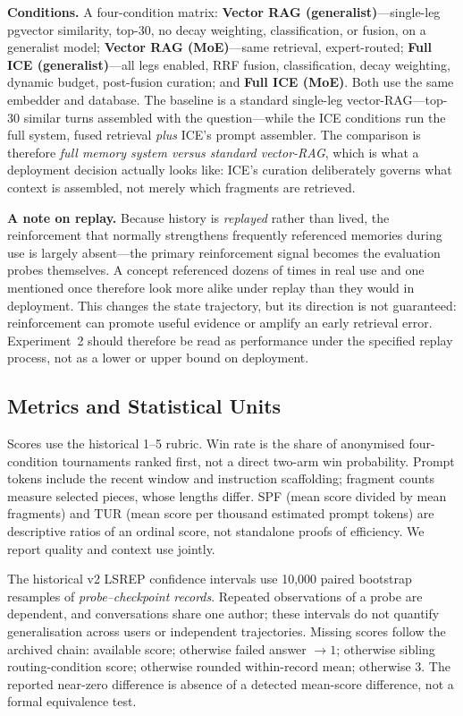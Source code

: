\documentclass[twoside,11pt]{article}
\begin{document}
\textbf{Conditions.} A four-condition matrix: \textbf{Vector RAG (generalist)}---single-leg pgvector similarity, top-30, no decay weighting, classification, or fusion, on a generalist model; \textbf{Vector RAG (MoE)}---same retrieval, expert-routed; \textbf{Full ICE (generalist)}---all legs enabled, RRF fusion, classification, decay weighting, dynamic budget, post-fusion curation; and \textbf{Full ICE (MoE)}. Both use the same embedder and database. The baseline is a standard single-leg vector-RAG---top-30 similar turns assembled with the question---while the ICE conditions run the full system, fused retrieval \emph{plus} ICE's prompt assembler. The comparison is therefore \emph{full memory system versus standard vector-RAG}, which is what a deployment decision actually looks like: ICE's curation deliberately governs what context is assembled, not merely which fragments are retrieved.

\textbf{A note on replay.} Because history is \emph{replayed} rather than lived, the reinforcement that normally strengthens frequently referenced memories during use is largely absent---the primary reinforcement signal becomes the evaluation probes themselves. A concept referenced dozens of times in real use and one mentioned once therefore look more alike under replay than they would in deployment. This changes the state trajectory, but its direction is not guaranteed: reinforcement can promote useful evidence or amplify an early retrieval error. Experiment~2 should therefore be read as performance under the specified replay process, not as a lower or upper bound on deployment.

\subsection{Metrics and Statistical Units}
Scores use the historical 1--5 rubric. Win rate is the share of anonymised four-condition tournaments ranked first, not a direct two-arm win probability. Prompt tokens include the recent window and instruction scaffolding; fragment counts measure selected pieces, whose lengths differ. SPF (mean score divided by mean fragments) and TUR (mean score per thousand estimated prompt tokens) are descriptive ratios of an ordinal score, not standalone proofs of efficiency. We report quality and context use jointly.

The historical v2 LSREP confidence intervals use 10,000 paired bootstrap resamples of \emph{probe--checkpoint records}. Repeated observations of a probe are dependent, and conversations share one author; these intervals do not quantify generalisation across users or independent trajectories. Missing scores follow the archived chain: available score; otherwise failed answer $\to1$; otherwise sibling routing-condition score; otherwise rounded within-record mean; otherwise 3. The reported near-zero difference is absence of a detected mean-score difference, not a formal equivalence test.
\end{document}

